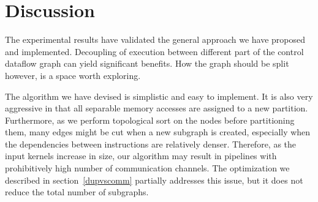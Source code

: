 \section{Discussion}
The experimental results have validated the general approach we have proposed and implemented. 
Decoupling of execution between different part of the control dataflow graph can yield
significant benefits. How the graph should be split however, is a space worth exploring.

The algorithm we have devised is simplistic and easy to implement.
It is also very aggressive in that all separable memory accesses are assigned to a new partition.
Furthermore, as we perform topological sort on the nodes before partitioning them, many
edges might be cut when a new subgraph is created, especially when the dependencies between instructions are relatively denser.
Therefore, as the input kernels increase in size, our algorithm may result in pipelines with prohibitively high number of communication channels. The optimization we described in section~\ref{dupvscomm}
partially addresses this issue, but it does not reduce the total number of subgraphs.

